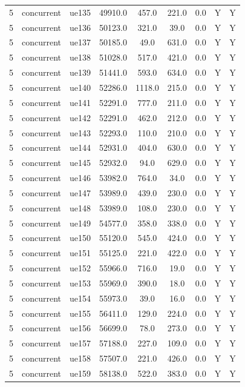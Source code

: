 \begin{table}[ht]
\begin{tabular}{|c|c|c|c|c|c|c|c|c|}
5 & concurrent & ue135 & 49910.0 & 457.0 & 221.0 & 0.0 & Y & Y \\
5 & concurrent & ue136 & 50123.0 & 321.0 & 39.0 & 0.0 & Y & Y \\
5 & concurrent & ue137 & 50185.0 & 49.0 & 631.0 & 0.0 & Y & Y \\
5 & concurrent & ue138 & 51028.0 & 517.0 & 421.0 & 0.0 & Y & Y \\
5 & concurrent & ue139 & 51441.0 & 593.0 & 634.0 & 0.0 & Y & Y \\
5 & concurrent & ue140 & 52286.0 & 1118.0 & 215.0 & 0.0 & Y & Y \\
5 & concurrent & ue141 & 52291.0 & 777.0 & 211.0 & 0.0 & Y & Y \\
5 & concurrent & ue142 & 52291.0 & 462.0 & 212.0 & 0.0 & Y & Y \\
5 & concurrent & ue143 & 52293.0 & 110.0 & 210.0 & 0.0 & Y & Y \\
5 & concurrent & ue144 & 52931.0 & 404.0 & 630.0 & 0.0 & Y & Y \\
5 & concurrent & ue145 & 52932.0 & 94.0 & 629.0 & 0.0 & Y & Y \\
5 & concurrent & ue146 & 53982.0 & 764.0 & 34.0 & 0.0 & Y & Y \\
5 & concurrent & ue147 & 53989.0 & 439.0 & 230.0 & 0.0 & Y & Y \\
5 & concurrent & ue148 & 53989.0 & 108.0 & 230.0 & 0.0 & Y & Y \\
5 & concurrent & ue149 & 54577.0 & 358.0 & 338.0 & 0.0 & Y & Y \\
5 & concurrent & ue150 & 55120.0 & 545.0 & 424.0 & 0.0 & Y & Y \\
5 & concurrent & ue151 & 55125.0 & 221.0 & 422.0 & 0.0 & Y & Y \\
5 & concurrent & ue152 & 55966.0 & 716.0 & 19.0 & 0.0 & Y & Y \\
5 & concurrent & ue153 & 55969.0 & 390.0 & 18.0 & 0.0 & Y & Y \\
5 & concurrent & ue154 & 55973.0 & 39.0 & 16.0 & 0.0 & Y & Y \\
5 & concurrent & ue155 & 56411.0 & 129.0 & 224.0 & 0.0 & Y & Y \\
5 & concurrent & ue156 & 56699.0 & 78.0 & 273.0 & 0.0 & Y & Y \\
5 & concurrent & ue157 & 57188.0 & 227.0 & 109.0 & 0.0 & Y & Y \\
5 & concurrent & ue158 & 57507.0 & 221.0 & 426.0 & 0.0 & Y & Y \\
5 & concurrent & ue159 & 58138.0 & 522.0 & 383.0 & 0.0 & Y & Y \\

\end{tabular}
\end{table}
